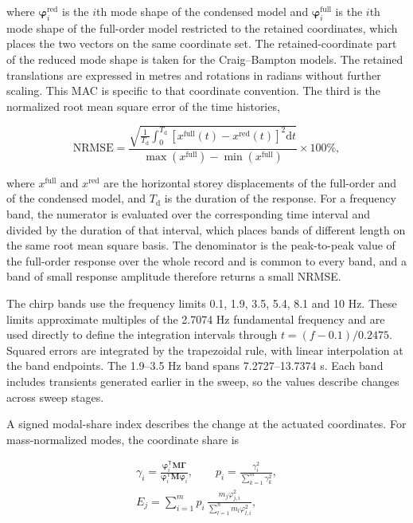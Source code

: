 \documentclass[a4paper,fleqn,review,12pt]{cas-sc}
\numberwithin{equation}{section}
\newcommand{\rev}[1]{{\color{red}#1}}
\begin{document}
\noindent where \(\bm{\varphi}_{i}^{\mathrm{red}}\) is the \(i\)th mode shape of the condensed model and \(\bm{\varphi}_{i}^{\mathrm{full}}\) is the \(i\)th mode shape of the full-order model restricted to the retained coordinates, which places the two vectors on the same coordinate set. The retained-coordinate part of the reduced mode shape is taken for the Craig--Bampton models. \rev{The retained translations are expressed in metres and rotations in radians without further scaling. This MAC is specific to that coordinate convention.} The third is the normalized root mean square error of the time histories,

\begin{equation}
	\mathrm{NRMSE}=
	\frac{\displaystyle\sqrt{\frac{1}{T_{\mathrm{d}}}\int_{0}^{T_{\mathrm{d}}}
			\left[x^{\mathrm{full}}(t)-x^{\mathrm{red}}(t)\right]^{2}\mathrm{d}t}}
	{\max\left(x^{\mathrm{full}}\right)-\min\left(x^{\mathrm{full}}\right)}
	\times100\%,
	\label{eq:nrmse}
\end{equation}

\noindent where \(x^{\mathrm{full}}\) and \(x^{\mathrm{red}}\) are the horizontal storey displacements of the full-order and of the condensed model, and \(T_{\mathrm{d}}\) is the duration of the response. For a frequency band, the numerator is evaluated over the corresponding time interval and divided by the duration of that interval, which places bands of different length on the same root mean square basis. The denominator is the peak-to-peak value of the full-order response over the whole record and is common to every band, and a band of small response amplitude therefore returns a small NRMSE.

\rev{The chirp bands use the frequency limits 0.1, 1.9, 3.5, 5.4, 8.1 and 10 Hz. These limits approximate multiples of the 2.7074 Hz fundamental frequency and are used directly to define the integration intervals through \(t=(f-0.1)/0.2475\). Squared errors are integrated by the trapezoidal rule, with linear interpolation at the band endpoints. The 1.9--3.5 Hz band spans 7.2727--13.7374 s. Each band includes transients generated earlier in the sweep, so the values describe changes across sweep stages.}

\rev{A signed modal-share index describes the change at the actuated coordinates. For mass-normalized modes, the coordinate share is}

\begin{equation}
	\begin{gathered}
		\gamma_{i}=
		\frac{\bm{\varphi}_{i}^{\mathsf{T}}\mathbf{M}\bm{\Gamma}}
		{\bm{\varphi}_{i}^{\mathsf{T}}\mathbf{M}\bm{\varphi}_{i}},
		\qquad
		p_{i}=\frac{\gamma_{i}^{2}}{\displaystyle\sum_{k=1}^{m}\gamma_{k}^{2}},\\[2pt]
		E_{j}=\sum_{i=1}^{m}p_{i}\,
		\frac{m_{j}\varphi_{j,i}^{2}}{\displaystyle\sum_{l=1}^{n}m_{l}\varphi_{l,i}^{2}},
	\end{gathered}
	\label{eq:dof-energy}
\end{equation}
\end{document}
